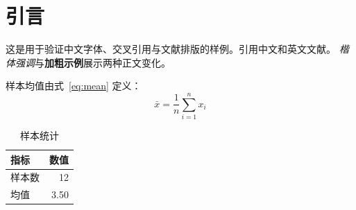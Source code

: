 \section{引言}
这是用于验证中文字体、交叉引用与文献排版的样例。引用中文和英文文献\cite{ye2005,knuth1984}。
\emph{楷体强调}与\textbf{加粗示例}展示两种正文变化。

样本均值由式~\eqref{eq:mean} 定义：
\begin{equation}
  \bar{x} = \frac{1}{n}\sum_{i=1}^{n}x_i\label{eq:mean}
\end{equation}

\begin{table}[htbp]
  \centering
  \caption{样本统计}\label{tab:summary}
  \begin{tabular}{lr}
    \toprule
    指标 & 数值 \\
    \midrule
    样本数 & 12 \\
    均值 & 3.50 \\
    \bottomrule
  \end{tabular}
\end{table}

